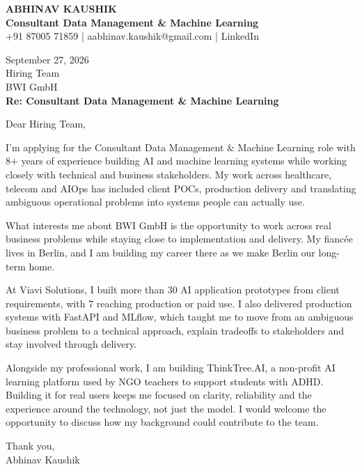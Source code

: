 \documentclass[10pt,a4paper]{article}
\begin{document}
\begin{center}
{\Large\bfseries ABHINAV KAUSHIK}\\[2pt]
{\bfseries Consultant Data Management \& Machine Learning}\\[2pt]
+91 87005 71859 \quad | \quad aabhinav.kaushik@gmail.com \quad | \quad LinkedIn
\end{center}
\vspace{8pt}
September 27, 2026\\[6pt]
Hiring Team\\
BWI GmbH\\[4pt]
\textbf{Re: Consultant Data Management \& Machine Learning}

Dear Hiring Team,

I’m applying for the Consultant Data Management \& Machine Learning role with 8+ years of experience building AI and machine learning systems while working closely with technical and business stakeholders. My work across healthcare, telecom and AIOps has included client POCs, production delivery and translating ambiguous operational problems into systems people can actually use.

What interests me about BWI GmbH is the opportunity to work across real business problems while staying close to implementation and delivery. My fiancée lives in Berlin, and I am building my career there as we make Berlin our long-term home.

At Viavi Solutions, I built more than 30 AI application prototypes from client requirements, with 7 reaching production or paid use. I also delivered production systems with FastAPI and MLflow, which taught me to move from an ambiguous business problem to a technical approach, explain tradeoffs to stakeholders and stay involved through delivery.

Alongside my professional work, I am building ThinkTree.AI, a non-profit AI learning platform used by NGO teachers to support students with ADHD. Building it for real users keeps me focused on clarity, reliability and the experience around the technology, not just the model. I would welcome the opportunity to discuss how my background could contribute to the team.

Thank you,\\
Abhinav Kaushik
\end{document}
